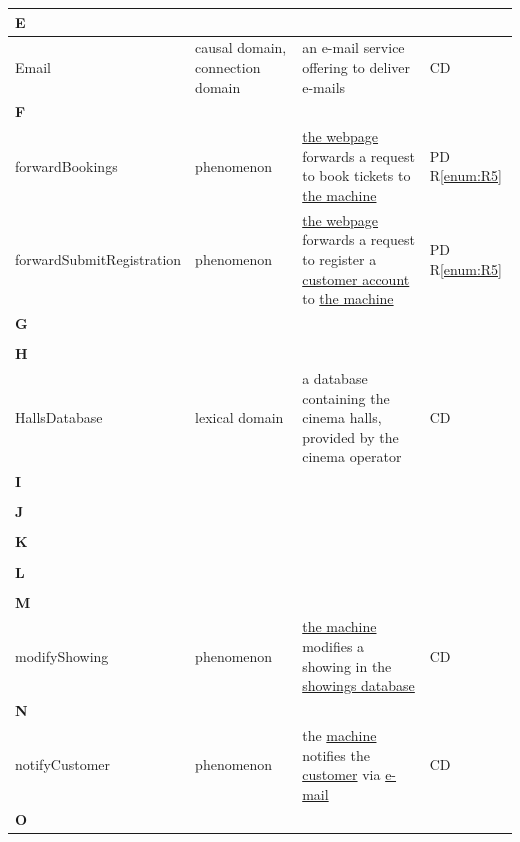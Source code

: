 \documentclass[a4paper,10pt,titlepage,bibtotoc,bibtotocnumbered]{scrreprt}
\begin{document}
\begin{longtable}{|l|p{3cm}|p{5cm}|l|}
\hline
\multicolumn{4}{|l|}{\textbf{E}}\\
\hline
\hypertarget{glossary:Email}{Email} & causal domain, connection domain & an e-mail service offering to deliver e-mails & CD\\
\hline
\multicolumn{4}{|l|}{\textbf{F}}\\
\hline
\hypertarget{glossary:forwardBookings}{forwardBookings} & phenomenon & \hyperlink{glossary:WebpageBookTickets}{the webpage} forwards a request to book tickets to \hyperlink{glossary:UDEKino}{the machine} & PD R\ref{enum:R5}\\
\hline
\hypertarget{glossary:forwardSubmitRegistration}{forwardSubmitRegistration} & phenomenon & \hyperlink{glossary:WebpageRegisterCustomer}{the webpage} forwards a request to register a \hyperlink{glossary:Customer}{customer account} to \hyperlink{glossary:UDEKino}{the machine} & PD R\ref{enum:R5}\\
\hline
\multicolumn{4}{|l|}{\textbf{G}}\\
\hline
&  &  & \\
\hline
\multicolumn{4}{|l|}{\textbf{H}}\\
\hline
\hypertarget{glossary:HallsDatabase}{HallsDatabase} & lexical domain & a database containing the cinema halls, provided by the cinema operator & CD\\
\hline
\multicolumn{4}{|l|}{\textbf{I}}\\
\hline
&  &  & \\
\hline
\multicolumn{4}{|l|}{\textbf{J}}\\
\hline
&  &  & \\
\hline
\multicolumn{4}{|l|}{\textbf{K}}\\
\hline
&  &  & \\
\hline
\multicolumn{4}{|l|}{\textbf{L}}\\
&  &  & \\
\hline
\multicolumn{4}{|l|}{\textbf{M}}\\
\hline
\hypertarget{glossary:modifyShowing}{modifyShowing}& phenomenon & \hyperlink{glossary:UDEKino}{the machine} modifies a showing in the \hyperlink{glossary:ShowingsDatabase}{showings database} & CD\\
\hline
\multicolumn{4}{|l|}{\textbf{N}}\\
\hline
\hypertarget{glossary:notifyCustomer}{notifyCustomer} & phenomenon & the \hyperlink{glossary:UDEKino}{machine} notifies the \hyperlink{glossary:Customer}{customer} via \hyperlink{glossary:Email}{e-mail} & CD\\
\hline
\multicolumn{4}{|l|}{\textbf{O}}\\

\end{longtable}
\end{document}
